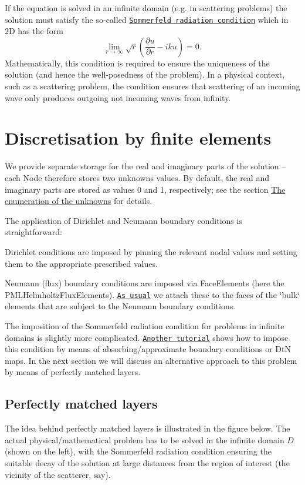 If the equation is solved in an infinite domain (e.\+g. in scattering problems) the solution must satisfy the so-\/called \href{http://en.wikipedia.org/wiki/Sommerfeld_radiation_condition}{\tt Sommerfeld radiation condition} which in 2D has the form \[ \lim_{r\to \infty} \sqrt{r} \left(\frac{\partial u}{\partial r} - iku \right) =0. \] Mathematically, this condition is required to ensure the uniqueness of the solution (and hence the well-\/posedness of the problem). In a physical context, such as a scattering problem, the condition ensures that scattering of an incoming wave only produces outgoing not incoming waves from infinity.\hypertarget{index_discr}{}\section{Discretisation by finite elements}\label{index_discr}
We provide separate storage for the real and imaginary parts of the solution -- each {\ttfamily Node} therefore stores two unknowns values. By default, the real and imaginary parts are stored as values 0 and 1, respectively; see the section \hyperlink{index_numbering}{The enumeration of the unknowns} for details.

The application of Dirichlet and Neumann boundary conditions is straightforward\+:
\begin{DoxyItemize}
\item Dirichlet conditions are imposed by pinning the relevant nodal values and setting them to the appropriate prescribed values.
\item Neumann (flux) boundary conditions are imposed via {\ttfamily Face\+Elements} (here the {\ttfamily P\+M\+L\+Helmholtz\+Flux\+Elements}). \href{../../../poisson/two_d_poisson_flux_bc/html/index.html}{\tt As usual} we attach these to the faces of the \char`\"{}bulk\char`\"{} elements that are subject to the Neumann boundary conditions.
\end{DoxyItemize}The imposition of the Sommerfeld radiation condition for problems in infinite domains is slightly more complicated. \href{../../../helmholtz/scattering/html/index.html}{\tt Another tutorial} shows how to impose this condition by means of absorbing/approximate boundary conditions or DtN maps. In the next section we will discuss an alternative approach to this problem by means of perfectly matched layers.\hypertarget{index_pml}{}\subsection{Perfectly matched layers}\label{index_pml}
The idea behind perfectly matched layers is illustrated in the figure below. The actual physical/mathematical problem has to be solved in the infinite domain $ D $ (shown on the left), with the Sommerfeld radiation condition ensuring the suitable decay of the solution at large distances from the region of interest (the vicinity of the scatterer, say).

